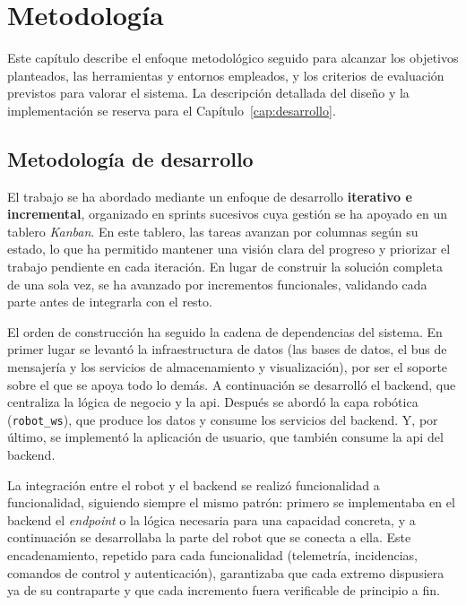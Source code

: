 \chapter{Metodología}
\label{cap:metodologia}

Este capítulo describe el enfoque metodológico seguido para alcanzar los
objetivos planteados, las herramientas y entornos empleados, y los criterios de
evaluación previstos para valorar el sistema. La descripción detallada del
diseño y la implementación se reserva para el Capítulo~\ref{cap:desarrollo}.

\section{Metodología de desarrollo}
\label{sec:metodologia-desarrollo}

El trabajo se ha abordado mediante un enfoque de desarrollo \textbf{iterativo e
incremental}, organizado en sprints sucesivos cuya gestión se ha apoyado en un
tablero \textit{Kanban}. En este tablero, las tareas avanzan por columnas según
su estado, lo que ha permitido mantener una visión clara del progreso y priorizar
el trabajo pendiente en cada iteración. En lugar de construir la solución completa
de una sola vez, se ha avanzado por incrementos funcionales, validando cada parte
antes de integrarla con el resto.

El orden de construcción ha seguido la cadena de dependencias del sistema. En
primer lugar se levantó la infraestructura de datos (las bases de datos, el bus de
mensajería y los servicios de almacenamiento y visualización), por ser el soporte
sobre el que se apoya todo lo demás. A continuación se desarrolló el backend, que
centraliza la lógica de negocio y la \gls{api}. Después se abordó la capa robótica
(\texttt{robot\_ws}), que produce los datos y consume los servicios del backend. Y,
por último, se implementó la aplicación de usuario, que también consume la
\gls{api} del backend.

La integración entre el robot y el backend se realizó funcionalidad a
funcionalidad, siguiendo siempre el mismo patrón: primero se implementaba en el
backend el \textit{endpoint} o la lógica necesaria para una capacidad concreta, y
a continuación se desarrollaba la parte del robot que se conecta a ella. Este
encadenamiento, repetido para cada funcionalidad (telemetría, incidencias,
comandos de control y autenticación), garantizaba que cada extremo dispusiera ya
de su contraparte y que cada incremento fuera verificable de principio a fin.

